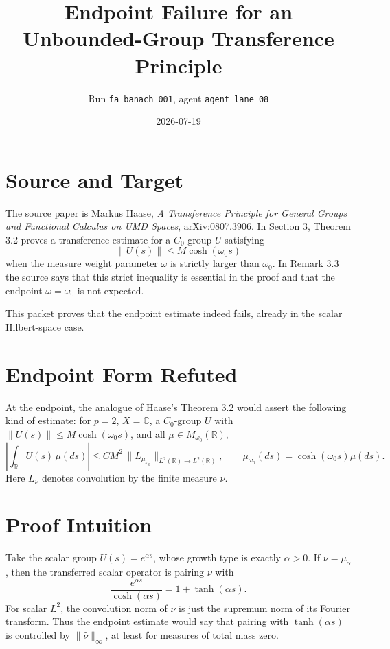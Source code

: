\documentclass[11pt]{article}
\title{Endpoint Failure for an Unbounded-Group Transference Principle}
\author{Run \texttt{fa\_banach\_001}, agent \texttt{agent\_lane\_08}}
\date{2026-07-19}
\newcommand{\R}{\mathbb R}
\newcommand{\C}{\mathbb C}
\begin{document}
\maketitle

\section*{Source and Target}

The source paper is Markus Haase, \emph{A Transference Principle for General
Groups and Functional Calculus on UMD Spaces}, arXiv:0807.3906. In Section 3,
Theorem 3.2 proves a transference estimate for a \(C_0\)-group \(U\) satisfying
\[
  \|U(s)\| \le M\cosh(\omega_0 s)
\]
when the measure weight parameter \(\omega\) is strictly larger than
\(\omega_0\). In Remark 3.3 the source says that this strict inequality is
essential in the proof and that the endpoint \(\omega=\omega_0\) is not
expected.

This packet proves that the endpoint estimate indeed fails, already in the
scalar Hilbert-space case.

\section*{Endpoint Form Refuted}

At the endpoint, the analogue of Haase's Theorem 3.2 would assert the following
kind of estimate: for \(p=2\), \(X=\C\), a \(C_0\)-group \(U\) with
\(\|U(s)\|\le M\cosh(\omega_0s)\), and all \(\mu\in M_{\omega_0}(\R)\),
\[
  \left|\int_\R U(s)\,\mu(ds)\right|
  \le C M^2\, \|L_{\mu_{\omega_0}}\|_{L^2(\R)\to L^2(\R)},
  \qquad
  \mu_{\omega_0}(ds)=\cosh(\omega_0s)\mu(ds).
\]
Here \(L_\nu\) denotes convolution by the finite measure \(\nu\).

\section*{Proof Intuition}

Take the scalar group \(U(s)=e^{\alpha s}\), whose growth type is exactly
\(\alpha>0\). If \(\nu=\mu_\alpha\), then the transferred scalar operator is
pairing \(\nu\) with
\[
  \frac{e^{\alpha s}}{\cosh(\alpha s)}=1+\tanh(\alpha s).
\]
For scalar \(L^2\), the convolution norm of \(\nu\) is just the supremum norm
of its Fourier transform. Thus the endpoint estimate would say that pairing
with \(\tanh(\alpha s)\) is controlled by \(\|\widehat\nu\|_\infty\), at least
for measures of total mass zero.
\end{document}
